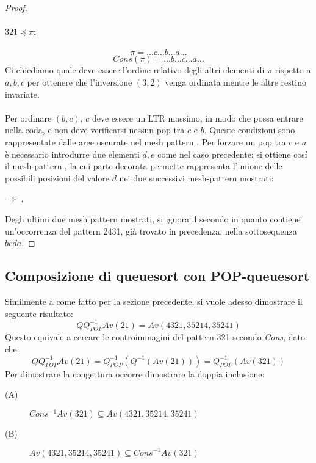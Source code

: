 \begin{proof}
\paragraph*{$321\preceq\pi$:}$$\pi=\dots c\dots b\dots a\dots$$$$Cons(\pi)=\dots b\dots c\dots a\dots$$
Ci chiediamo quale deve essere l'ordine relativo degli altri elementi di $\pi$ rispetto a $a,b,c$ per ottenere che l'inversione $(3,2)$ venga ordinata mentre le altre restino invariate.\\\\
Per ordinare $(b,c)$, $c$ deve essere un LTR massimo, in modo che possa entrare nella coda, e non deve verificarsi nessun pop tra $c$ e $b$. Queste condizioni sono rappresentate dalle aree oscurate nel mesh pattern . Per forzare un pop tra $c$ e $a$ \`e necessario introdurre due elementi $d,e$ come nel caso precedente: si ottiene cos\'i il mesh-pattern , la cui parte decorata permette rappresenta l'unione delle possibili posizioni del valore $d$ nei due successivi mesh-pattern mostrati:
\begin{center}
 $\Rightarrow$
,
\end{center}
Degli ultimi due mesh pattern mostrati, si ignora il secondo in quanto contiene un'occorrenza del pattern 2431, gi\`a trovato in precedenza, nella sottosequenza $beda$.
\end{proof}
\subsection{Composizione di queuesort con POP-queuesort}
Similmente a come fatto per la sezione precedente, si vuole adesso dimostrare il seguente risultato:
$$QQ_{POP}^{-1}Av(21) = Av(4321, 35214, 35241)$$
Questo equivale a cercare le controimmagini del pattern 321 secondo \textit{Cons}, dato che:
$$QQ_{POP}^{-1}Av(21) = Q_{POP}^{-1}(Q^{-1}(Av(21))) = Q_{POP}^{-1}(Av(321))$$
Per dimostrare la congettura occorre dimostrare la doppia inclusione:
\begin{description}
\item[(A)]$Cons^{-1}Av(321) \subseteq Av(4321, 35214, 35241)$
\item[(B)]$Av(4321, 35214, 35241) \subseteq Cons^{-1}Av(321)$
\end{description}
